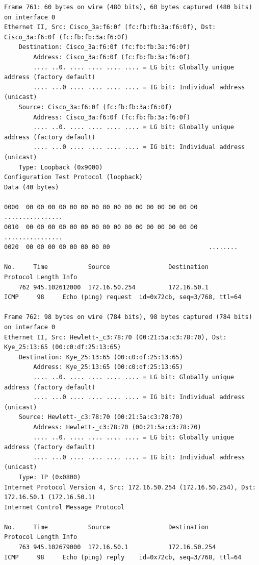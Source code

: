 \documentclass[a4paper,11pt]{article}
\begin{document}
\begin{lstlisting}
Frame 761: 60 bytes on wire (480 bits), 60 bytes captured (480 bits) on interface 0
Ethernet II, Src: Cisco_3a:f6:0f (fc:fb:fb:3a:f6:0f), Dst: Cisco_3a:f6:0f (fc:fb:fb:3a:f6:0f)
    Destination: Cisco_3a:f6:0f (fc:fb:fb:3a:f6:0f)
        Address: Cisco_3a:f6:0f (fc:fb:fb:3a:f6:0f)
        .... ..0. .... .... .... .... = LG bit: Globally unique address (factory default)
        .... ...0 .... .... .... .... = IG bit: Individual address (unicast)
    Source: Cisco_3a:f6:0f (fc:fb:fb:3a:f6:0f)
        Address: Cisco_3a:f6:0f (fc:fb:fb:3a:f6:0f)
        .... ..0. .... .... .... .... = LG bit: Globally unique address (factory default)
        .... ...0 .... .... .... .... = IG bit: Individual address (unicast)
    Type: Loopback (0x9000)
Configuration Test Protocol (loopback)
Data (40 bytes)

0000  00 00 00 00 00 00 00 00 00 00 00 00 00 00 00 00   ................
0010  00 00 00 00 00 00 00 00 00 00 00 00 00 00 00 00   ................
0020  00 00 00 00 00 00 00 00                           ........

No.     Time           Source                Destination           Protocol Length Info
    762 945.102612000  172.16.50.254         172.16.50.1           ICMP     98     Echo (ping) request  id=0x72cb, seq=3/768, ttl=64

Frame 762: 98 bytes on wire (784 bits), 98 bytes captured (784 bits) on interface 0
Ethernet II, Src: Hewlett-_c3:78:70 (00:21:5a:c3:78:70), Dst: Kye_25:13:65 (00:c0:df:25:13:65)
    Destination: Kye_25:13:65 (00:c0:df:25:13:65)
        Address: Kye_25:13:65 (00:c0:df:25:13:65)
        .... ..0. .... .... .... .... = LG bit: Globally unique address (factory default)
        .... ...0 .... .... .... .... = IG bit: Individual address (unicast)
    Source: Hewlett-_c3:78:70 (00:21:5a:c3:78:70)
        Address: Hewlett-_c3:78:70 (00:21:5a:c3:78:70)
        .... ..0. .... .... .... .... = LG bit: Globally unique address (factory default)
        .... ...0 .... .... .... .... = IG bit: Individual address (unicast)
    Type: IP (0x0800)
Internet Protocol Version 4, Src: 172.16.50.254 (172.16.50.254), Dst: 172.16.50.1 (172.16.50.1)
Internet Control Message Protocol

No.     Time           Source                Destination           Protocol Length Info
    763 945.102679000  172.16.50.1           172.16.50.254         ICMP     98     Echo (ping) reply    id=0x72cb, seq=3/768, ttl=64


\end{lstlisting}
\end{document}
